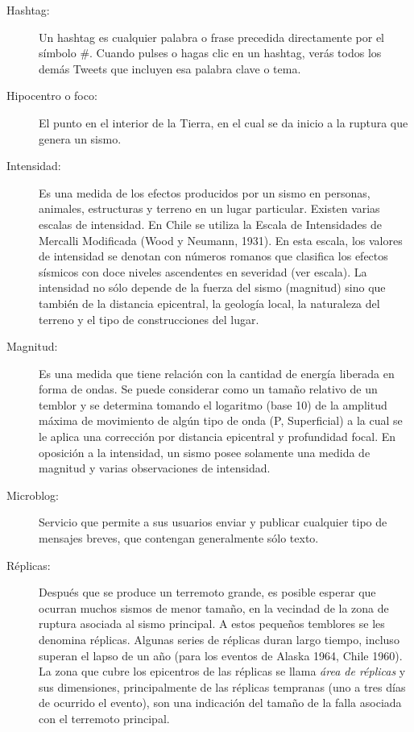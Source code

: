 \begin{description}
\item[Hashtag:] Un hashtag es cualquier palabra o frase precedida directamente por el símbolo \#. Cuando pulses o hagas clic en un hashtag, verás todos los demás Tweets que incluyen esa palabra clave o tema.\cite{twitterglosary}

\item[Hipocentro o foco:] El punto en el interior de la Tierra, en el cual se da inicio a la ruptura que genera un sismo.\cite{csnglosary}

\item[Intensidad:] Es una medida de los efectos producidos por un sismo en personas, animales, estructuras y terreno en un lugar particular. Existen varias escalas de intensidad. En Chile se utiliza la Escala de Intensidades de Mercalli Modificada (Wood y Neumann, 1931). En esta escala, los valores de intensidad se denotan con números romanos que clasifica los efectos sísmicos con doce niveles ascendentes en severidad (ver escala). La intensidad no sólo depende de la fuerza del sismo (magnitud) sino que también de la distancia epicentral, la geología local, la naturaleza del terreno y el tipo de construcciones del lugar.\cite{csnglosary}

\item[Magnitud:] Es una medida que tiene relación con la cantidad de energía liberada en forma de ondas. Se puede considerar como un tamaño relativo de un temblor y se determina tomando el logaritmo (base 10) de la amplitud máxima de movimiento de algún tipo de onda (P, Superficial) a la cual se le aplica una corrección por distancia epicentral y profundidad focal. En oposición a la intensidad, un sismo posee solamente una medida de magnitud y varias observaciones de intensidad.\cite{csnglosary}

\item[Microblog:] Servicio que permite a sus usuarios enviar y publicar cualquier tipo de mensajes breves, que contengan generalmente sólo texto.\cite{microbloggingwiki}

\item[Réplicas:] Después que se produce un terremoto grande, es posible esperar que ocurran muchos sismos de menor tamaño, en la vecindad de la zona de ruptura asociada al sismo principal. A estos pequeños temblores se les denomina réplicas. Algunas series de réplicas duran largo tiempo, incluso superan el lapso de un año (para los eventos de Alaska 1964, Chile 1960). La zona que cubre los epicentros de las réplicas se llama \textit{área de réplicas} y sus dimensiones, principalmente de las réplicas tempranas (uno a tres días de ocurrido el evento), son una indicación del tamaño de la falla asociada con el terremoto principal.\cite{csnglosary}


\end{description}
